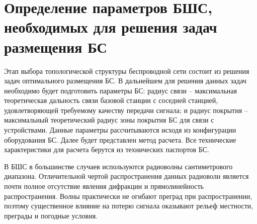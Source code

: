 \section{Определение параметров БШС, необходимых для решения задач размещения БС} \label{section:part_1_link_distance}



Этап выбора топологической структуры беспроводной сети состоит из решения задач оптимального размещения БС. В дальнейшем для решения данных задач необходимо будет подготовить параметры БС: радиус связи -- максимальная теоретическая дальность связи базовой станции с соседней станцией, удовлетворяющей требуемому качеству передачи сигнала; и радиус покрытия -- максимальный теоретический радиус зоны покрытия БС для связи с устройствами. Данные параметры рассчитываются исходя из конфигурации оборудования БС. Далее будет представлен метод расчета. Все технические характеристики для расчета берутся из технических паспортов БС.




В БШС в большинстве случаев используются радиоволны сантиметрового диапазона. Отличительной чертой распространения данных радиоволн  является почти полное отсутствие явления дифракции и прямолинейность распространения. Волны практически не огибают преград при распространении, поэтому существенное влияние на потерю сигнала оказывают рельеф местности, преграды и погодные условия. 

